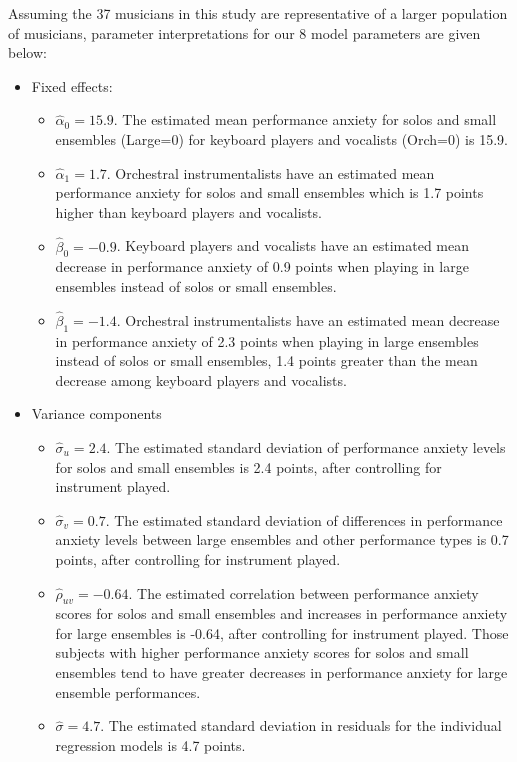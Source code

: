 \documentclass[
]{krantz}
\providecommand{\tightlist}{%
  \setlength{\itemsep}{0pt}\setlength{\parskip}{0pt}}
\begin{document}
Assuming the 37 musicians in this study are representative of a larger population of musicians, parameter interpretations for our 8 model parameters are given below:

\begin{itemize}
\tightlist
\item
  Fixed effects:

  \begin{itemize}
  \tightlist
  \item
    \(\hat{\alpha}_{0} = 15.9\). The estimated mean performance anxiety for solos and small ensembles (Large=0) for keyboard players and vocalists (Orch=0) is 15.9.
  \item
    \(\hat{\alpha}_{1} = 1.7\). Orchestral instrumentalists have an estimated mean performance anxiety for solos and small ensembles which is 1.7 points higher than keyboard players and vocalists.
  \item
    \(\hat{\beta}_{0} = -0.9\). Keyboard players and vocalists have an estimated mean decrease in performance anxiety of 0.9 points when playing in large ensembles instead of solos or small ensembles.
  \item
    \(\hat{\beta}_{1} = -1.4\). Orchestral instrumentalists have an estimated mean decrease in performance anxiety of 2.3 points when playing in large ensembles instead of solos or small ensembles, 1.4 points greater than the mean decrease among keyboard players and vocalists.
  \end{itemize}
\item
  Variance components

  \begin{itemize}
  \tightlist
  \item
    \(\hat{\sigma}_{u} = 2.4\). The estimated standard deviation of performance anxiety levels for solos and small ensembles is 2.4 points, after controlling for instrument played.
  \item
    \(\hat{\sigma}_{v} = 0.7\). The estimated standard deviation of differences in performance anxiety levels between large ensembles and other performance types is 0.7 points, after controlling for instrument played.
  \item
    \(\hat{\rho}_{uv} = -0.64\). The estimated correlation between performance anxiety scores for solos and small ensembles and increases in performance anxiety for large ensembles is -0.64, after controlling for instrument played. Those subjects with higher performance anxiety scores for solos and small ensembles tend to have greater decreases in performance anxiety for large ensemble performances.
  \item
    \(\hat{\sigma} = 4.7.\) The estimated standard deviation in residuals for the individual regression models is 4.7 points.
  \end{itemize}
\end{itemize}
\end{document}
